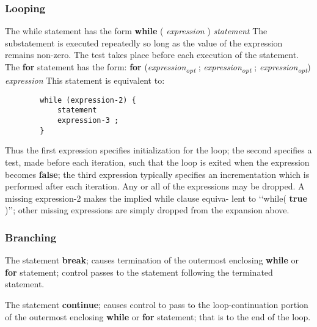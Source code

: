 \begin{homeworkProblem}
	\subsubsection{Looping}
	The while statement has the form
	\newline
	\textbf{while} ( \textit{expression} ) \textit{statement}
	\newline
	The substatement is executed repeatedly so long as the value of the expression remains non-zero. The test takes place before each execution of the statement.
	\newline
	\newline
	The \textbf{for} statement has the form:
	\newline
	\textbf{for} (\textit{expression\textsubscript{opt}} ; \textit{expression\textsubscript{opt}} ; \textit{expression\textsubscript{opt}}) \textit{expression}
	\newline
	This statement is equivalent to:
	\begin{verbatim}
		while (expression-2) {
			statement
			expression-3 ;
		}
	\end{verbatim}
	Thus the first expression specifies initialization for the loop; the second specifies a test, made before each iteration, such that the loop is exited when the expression becomes \textbf{false}; the third expression typically specifies an incrementation which is performed after each iteration.
	Any or all of the expressions may be dropped. A missing expression-2 makes the implied while clause equiva- lent to ‘‘while( \textbf{true} )’’; other missing expressions are simply dropped from the expansion above.
	
	\subsubsection{Branching}
	The statement
	\newline
	\newline
	\textbf{break};
	\newline
	\newline
	causes termination of the outermost enclosing \textbf{while} or \textbf{for} statement; control passes to the statement following the terminated statement.
	
	The statement 
	\newline
	\newline
	\textbf{continue};
	\newline
	\newline
	causes control to pass to the loop-continuation portion of the outermost enclosing \textbf{while} or \textbf{for} statement; that is to the end of the loop.
	

\end{homeworkProblem}
